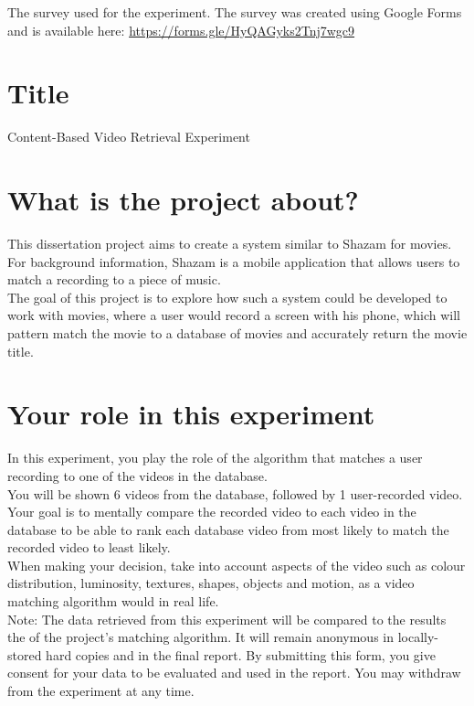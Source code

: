 The survey used for the experiment. The survey was created using Google Forms and is available here: \url{https://forms.gle/HyQAGyks2Tnj7wgc9}

\section{Title}

Content-Based Video Retrieval Experiment

\section{What is the project about?}

This dissertation project aims to create a system similar to Shazam for movies. 
For background information, Shazam is a mobile application that allows users to match a recording to a piece of music.\\

The goal of this project is to explore how such a system could be developed to work with movies, where a user would record a screen with his phone, which will pattern match the movie to a database of movies and accurately return the movie title.

\section{Your role in this experiment}

In this experiment, you play the role of the algorithm that matches a user recording to one of the videos in the database.\\

You will be shown 6 videos from the database, followed by 1 user-recorded video.\\

Your goal is to mentally compare the recorded video to each video in the database to be able to rank each database video from most likely to match the recorded video to least likely.\\

When making your decision, take into account aspects of the video such as colour distribution, luminosity, textures, shapes, objects and motion, as a video matching algorithm would in real life.\\

Note: The data retrieved from this experiment will be compared to the results the of the project's matching algorithm. It will remain anonymous in locally-stored hard copies and in the final report. By submitting this form, you give consent for your data to be evaluated and used in the report. You may withdraw from the experiment at any time.

